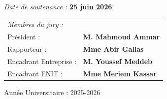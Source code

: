 \begin{titlepage}
\noindent
{\emph{Date de soutenance :}} {\textbf{25 juin 2026}}\\

\begin{table}[H]
\begin{tabular}{ll}
\emph{Membres du jury :} \vspace{0.3cm} & \\
Président :         & \textbf{M. Mahmoud Ammar} \\
Rapporteur :        & \textbf{Mme Abir Gallas} \\
Encadrant Entreprise : & \textbf{M. Youssef Meddeb} \\
Encadrant ENIT : & \textbf{Mme Meriem Kassar} \\
\end{tabular}
\end{table}

\vspace{0.3cm}
\begin{center}
Année Universitaire : 2025-2026
\end{center}

\end{titlepage}
